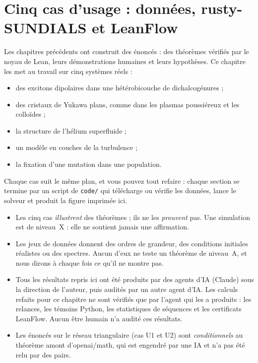 \chapter{Cinq cas d'usage : données, rusty-SUNDIALS et LeanFlow}\label{ch5:chapitre}\label{ch5:debut}

Les chapitres précédents ont construit des énoncés : des théorèmes vérifiés par le noyau de Lean, leurs
démonstrations humaines et leurs hypothèses. Ce chapitre les met au travail sur cinq systèmes réels :
\begin{itemize}
\item des excitons dipolaires dans une hétérobicouche de dichalcogénures ;
\item des cristaux de Yukawa plans, comme dans les plasmas poussiéreux et les colloïdes ;
\item la structure de l'hélium superfluide ;
\item un modèle en couches de la turbulence ;
\item la fixation d'une mutation dans une population.
\end{itemize}
Chaque cas suit le même plan, et vous pouvez tout refaire : chaque section se termine par un script de
\texttt{code/} qui télécharge ou vérifie les données, lance le solveur et produit la figure imprimée ici.

\begin{warnbox}
\begin{itemize}
\item Les cinq cas \emph{illustrent} des théorèmes ; ils ne les \emph{prouvent} pas. Une simulation est de
niveau~X : elle ne soutient jamais une affirmation.
\item Les jeux de données donnent des ordres de grandeur, des conditions initiales réalistes ou des spectres. Aucun
d'eux ne teste un théorème de niveau~A, et nous dirons à chaque fois ce qu'il ne montre pas.
\item Tous les résultats repris ici ont été produits par des agents d'IA (Claude) sous la direction de l'auteur,
puis audités par un autre agent d'IA. Les calculs refaits pour ce chapitre ne sont vérifiés que par l'agent qui les a
produits : les relances, les témoins Python, les statistiques de séquences et les certificats LeanFlow. Aucun être
humain n'a audité ces résultats.
\item Les énoncés sur le réseau triangulaire (cas U1 et U2) sont \emph{conditionnels} au théorème amont
 d'openai/math, qui est engendré par une IA et n'a pas été relu par des pairs.
\end{itemize}
\end{warnbox}

